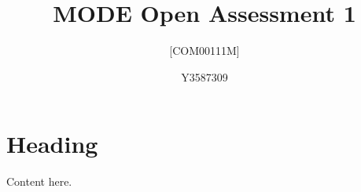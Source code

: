 \documentclass[paper=a4,fontsize=12pt]{scrartcl}
\author{Y3587309}
\title{MODE Open Assessment 1}
\subtitle{[COM00111M]}
\begin{document}
\maketitle

\clearpage
\section{Heading}
Content here.

\printbibliography
\end{document}

